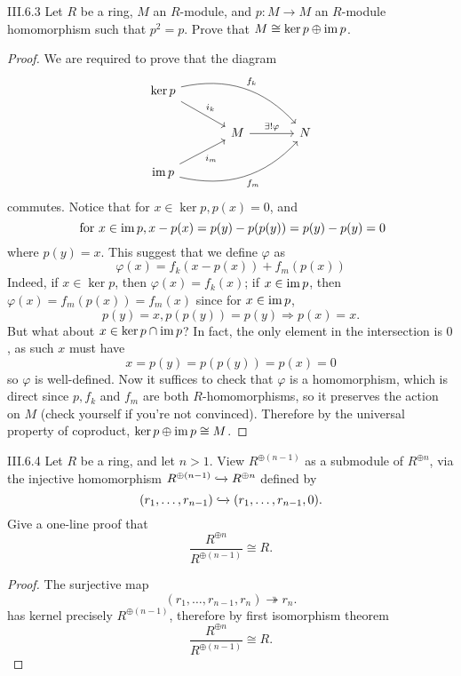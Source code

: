 \begin{problem}{III.6.3}
Let $R$ be a ring, $M$ an $R$-module, and $p : M \to M$ an $R$-module homomorphism such that $p^2 = p$. Prove that $M \cong \ker p \oplus \operatorname{im} p$.
\end{problem}
\begin{proof}
We are required to prove that the diagram
\[
\begin{tikzcd}[column sep=large]
\ker p \arrow[rd, "i_k"] \arrow[rrd, "f_k", bend left]  &                                &   \\
& M \arrow[r, "\exists!\varphi"] & N \\
\im p  \arrow[ru, "i_m"'] \arrow[rru, "f_m"', bend right] &                                &  
\end{tikzcd}
\]
commutes. Notice that for $x \in \ker p, p(x) = 0$, and
\[
\text{ for } x \in \operatorname{im} p, x - p(x) = p(y) - p(p(y)) = p(y) - p(y) = 0
\]
where $p(y) = x$. This suggest that we define $\varphi$ as 
\[
\varphi(x) = f_k(x - p(x)) + f_m(p(x))
\]
Indeed, if $x \in \ker p$, then $\varphi(x) = f_k(x)$; if $x \in \operatorname{im} p$, then $\varphi(x) = f_m(p(x)) = f_m(x)$ since for $x \in \operatorname{im} p$,
\[
p(y) = x, p(p(y)) = p(y) \Rightarrow p(x) = x.	
\]
But what about $x \in \ker p \cap \operatorname{im} p$? In fact, the only element in the intersection is $0$, as such $x$ must have
\[
x = p(y) = p(p(y)) = p(x) = 0
\]
so $\varphi$ is well-defined. Now it suffices to check that $\varphi$ is a homomorphism, which is direct since $p, f_k$ and $f_m$ are both $R$-homomorphisms, so it preserves the action on $M$ (check yourself if you're not convinced). Therefore by the universal property of coproduct, $\ker p \oplus \operatorname{im} p \cong M$.
\end{proof}

\begin{problem}{III.6.4}
Let $R$ be a ring, and let $n > 1$. View $R^{\oplus(n-1)}$ as a submodule of $R^{\oplus n}$, via the injective homomorphism $R^{\oplus(n-1)} \xhookrightarrow{} R^{\oplus n}$ defined by
\[
(r_1,\dotsc,r_{n-1}) \xhookrightarrow{}	(r_1,\dotsc,r_{n-1}, 0).
\]
Give a one-line proof that
\[
\frac{R^{\oplus n}}{R^{\oplus (n-1)}} \cong R.	
\] 
\end{problem}
\begin{proof}
The surjective map
\[
(r_1,\dotsc,r_{n-1}, r_n) \twoheadrightarrow r_n.
\]
has kernel precisely $R^{\oplus (n-1)}$, therefore by first isomorphism theorem
\[
\frac{R^{\oplus n}}{R^{\oplus (n-1)}} \cong R.	
\]  
\end{proof}

